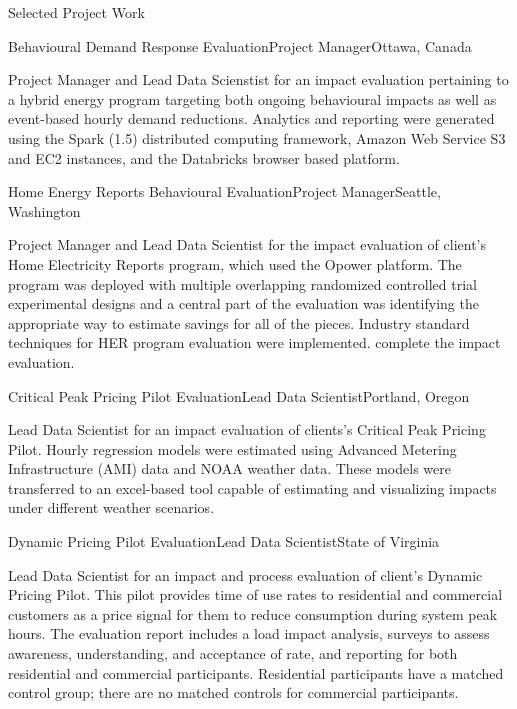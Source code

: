 \documentclass{resume} %
\begin{document}
\begin{rSection}{Selected Project Work}
\begin{rSubsection}{Behavioural Demand Response Evaluation}{}{Project Manager}{Ottawa, Canada}
\item[] Project Manager and Lead Data Scienstist for an impact evaluation pertaining to a hybrid energy program targeting both ongoing behavioural impacts as well as event-based hourly demand reductions. Analytics and reporting were generated using the Spark (1.5) distributed computing framework, Amazon Web Service S3 and EC2 instances, and the Databricks browser based platform. 

\end{rSubsection}

\begin{rSubsection}{Home Energy Reports Behavioural Evaluation}{}{Project Manager}{Seattle, Washington}
\item[] Project Manager and Lead Data Scientist for the impact evaluation of client's Home Electricity Reports program, which used the Opower platform. The program was deployed with multiple overlapping randomized controlled trial experimental designs and a central part of the evaluation was identifying the appropriate way to estimate savings for all of the pieces.   Industry standard techniques for HER program evaluation were implemented. complete the impact evaluation.
\end{rSubsection}  

\begin{rSubsection}{Critical Peak Pricing Pilot Evaluation}{}{Lead Data Scientist}{Portland, Oregon}
\item[] Lead Data Scientist for an impact evaluation of clients's Critical Peak Pricing Pilot. Hourly regression models were estimated using Advanced Metering Infrastructure (AMI) data and NOAA weather data. These models were transferred to an excel-based tool capable of estimating and visualizing impacts under different weather scenarios. 
\end{rSubsection}

\begin{rSubsection}{Dynamic Pricing Pilot Evaluation}{}{Lead Data Scientist}{State of Virginia}
\item[] Lead Data Scientist for an impact and process evaluation of client's Dynamic Pricing Pilot. This pilot provides time of use rates to residential and commercial customers as a price signal for them to reduce consumption during system peak hours. The evaluation report includes a load impact analysis, surveys to assess awareness, understanding, and acceptance of rate, and reporting for both residential and commercial participants. Residential participants have a matched control group; there are no matched controls for commercial participants.
\end{rSubsection}


\end{rSection}
\end{document}
